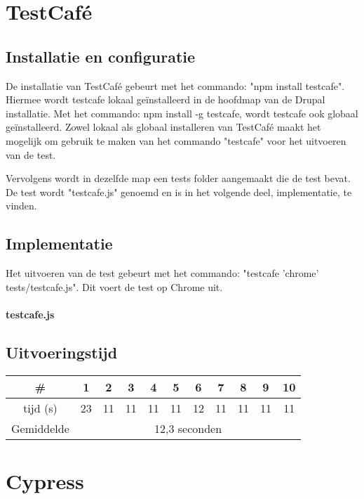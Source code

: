 \clearpage
\section{TestCafé}

\subsection{Installatie en configuratie}
De installatie van TestCafé gebeurt met het commando: "npm install testcafe". Hiermee wordt testcafe lokaal geïnstalleerd in de hoofdmap van de Drupal installatie. Met het commando: npm install -g testcafe, wordt testcafe ook globaal geïnstalleerd. Zowel lokaal als globaal installeren van TestCafé maakt het mogelijk om gebruik te maken van het commando "testcafe" voor het uitvoeren van de test.

Vervolgens wordt in dezelfde map een tests folder aangemaakt die de test bevat. De test wordt "testcafe.js" genoemd en is in het volgende deel, implementatie, te vinden.

\subsection{Implementatie}
Het uitvoeren van de test gebeurt met het commando: "testcafe 'chrome' tests/testcafe.js". Dit voert de test op Chrome uit.

\paragraph{testcafe.js}

\subsection{Uitvoeringstijd}

\begin{tabular}{ |c| |c |c |c |c |c |c |c |c |c |c| }
\hline
	\# & 1 & 2 & 3 & 4 & 5 & 6 & 7 & 8 & 9 & 10\\
\hline
	tijd (s) & 23 & 11 & 11 & 11 & 11 & 12 & 11 & 11 & 11 & 11\\
\hline
 Gemiddelde & \multicolumn{10}{c|}{12,3 seconden}\\
\hline
\end{tabular}

\clearpage
\section{Cypress}

